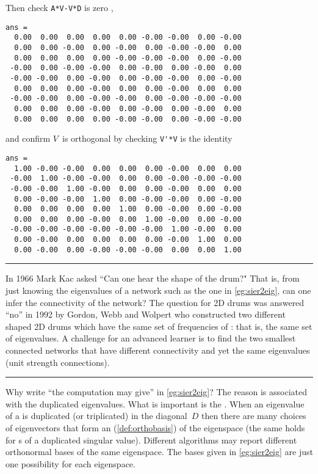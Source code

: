 \begin{example}
\begin{solution}
\begin{itemize}
\end{itemize}
Then check \verb|A*V-V*D| is zero \twodp,
{\small%
\begin{verbatim}
ans =
  0.00  0.00  0.00  0.00  0.00 -0.00 -0.00  0.00 -0.00
  0.00  0.00 -0.00  0.00 -0.00  0.00 -0.00 -0.00  0.00
  0.00  0.00  0.00  0.00 -0.00 -0.00 -0.00  0.00 -0.00
 -0.00  0.00 -0.00 -0.00  0.00 -0.00  0.00 -0.00  0.00
 -0.00 -0.00  0.00 -0.00  0.00 -0.00 -0.00  0.00 -0.00
  0.00  0.00  0.00 -0.00  0.00  0.00 -0.00  0.00  0.00
 -0.00 -0.00  0.00 -0.00 -0.00  0.00 -0.00 -0.00 -0.00
  0.00  0.00  0.00 -0.00  0.00 -0.00  0.00 -0.00  0.00
  0.00  0.00  0.00  0.00 -0.00 -0.00  0.00 -0.00 -0.00
\end{verbatim}
}
and confirm \(V\)~is orthogonal by checking \verb|V'*V| is the identity \twodp
{\small%
\begin{verbatim}
ans =
  1.00 -0.00 -0.00  0.00  0.00  0.00 -0.00  0.00  0.00
 -0.00  1.00 -0.00 -0.00  0.00  0.00 -0.00 -0.00 -0.00
 -0.00 -0.00  1.00 -0.00  0.00  0.00 -0.00  0.00  0.00
  0.00 -0.00 -0.00  1.00  0.00 -0.00 -0.00  0.00 -0.00
  0.00  0.00  0.00  0.00  1.00  0.00 -0.00  0.00 -0.00
  0.00  0.00  0.00 -0.00  0.00  1.00 -0.00  0.00 -0.00
 -0.00 -0.00 -0.00 -0.00 -0.00 -0.00  1.00 -0.00  0.00
  0.00 -0.00  0.00  0.00  0.00  0.00 -0.00  1.00  0.00
  0.00 -0.00  0.00 -0.00 -0.00 -0.00  0.00  0.00  1.00
\end{verbatim}
}
\end{solution}
\end{example}


\begin{table}\centering\sl
\rule{\linewidth}{1pt}
\begin{minipage}{\linewidth}
In 1966 Mark Kac asked ``Can one hear the shape of the drum?"
That is, from just knowing the eigenvalues of a network such as the one in \cref{eg:sier2eig}, can one infer the connectivity of the network?
The question for 2D drums was answered ``no'' in 1992 by Gordon, Webb and Wolpert who constructed two different shaped 2D drums which have the same set of frequencies of : that is, the same set of eigenvalues.
A challenge for an advanced learner is to find the two smallest connected networks that have different connectivity and yet the same eigenvalues (unit strength connections).
\end{minipage}
\rule{\linewidth}{1pt}
\end{table}

Why write ``the computation may give'' in \cref{eg:sier2eig}?  
The reason is associated with the duplicated eigenvalues.
What is important is the .
When an eigenvalue of a  is duplicated (or triplicated) in the diagonal~\(D\) then there are many choices of eigenvectors that form an  (\cref{def:orthobasis}) of the eigenspace (the same holds for s of a duplicated singular value).
Different algorithms may report different orthonormal bases of the same eigenspace.
The bases given in \cref{eg:sier2eig} are just one possibility for each eigenspace.




